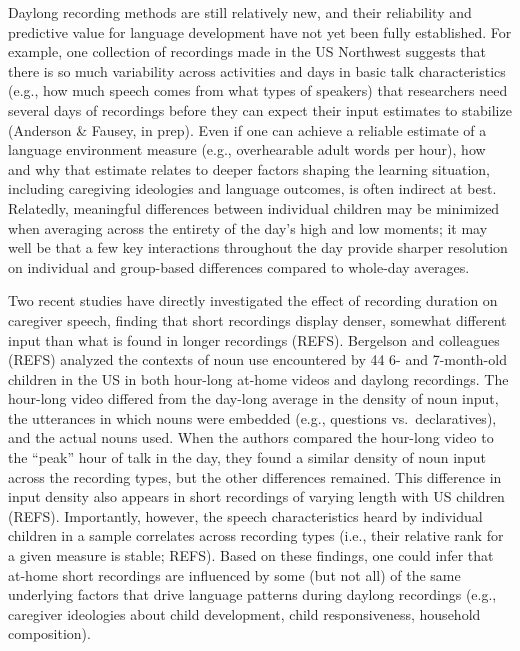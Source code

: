 \documentclass[,man,floatsintext]{apa6}
\begin{document}
Daylong recording methods are still relatively new, and their
reliability and predictive value for language development have not yet
been fully established. For example, one collection of recordings made
in the US Northwest suggests that there is so much variability across
activities and days in basic talk characteristics (e.g., how much speech
comes from what types of speakers) that researchers need several days of
recordings before they can expect their input estimates to stabilize
(Anderson \& Fausey, in prep). Even if one can achieve a reliable
estimate of a language environment measure (e.g., overhearable adult
words per hour), how and why that estimate relates to deeper factors
shaping the learning situation, including caregiving ideologies and
language outcomes, is often indirect at best. Relatedly, meaningful
differences between individual children may be minimized when averaging
across the entirety of the day's high and low moments; it may well be
that a few key interactions throughout the day provide sharper
resolution on individual and group-based differences compared to
whole-day averages.

Two recent studies have directly investigated the effect of recording
duration on caregiver speech, finding that short recordings display
denser, somewhat different input than what is found in longer recordings
(REFS). Bergelson and colleagues (REFS) analyzed the contexts of noun
use encountered by 44 6- and 7-month-old children in the US in both
hour-long at-home videos and daylong recordings. The hour-long video
differed from the day-long average in the density of noun input, the
utterances in which nouns were embedded (e.g., questions
vs.~declaratives), and the actual nouns used. When the authors compared
the hour-long video to the \enquote{peak} hour of talk in the day, they
found a similar density of noun input across the recording types, but
the other differences remained. This difference in input density also
appears in short recordings of varying length with US children (REFS).
Importantly, however, the speech characteristics heard by individual
children in a sample correlates across recording types (i.e., their
relative rank for a given measure is stable; REFS). Based on these
findings, one could infer that at-home short recordings are influenced
by some (but not all) of the same underlying factors that drive language
patterns during daylong recordings (e.g., caregiver ideologies about
child development, child responsiveness, household composition).
\end{document}
